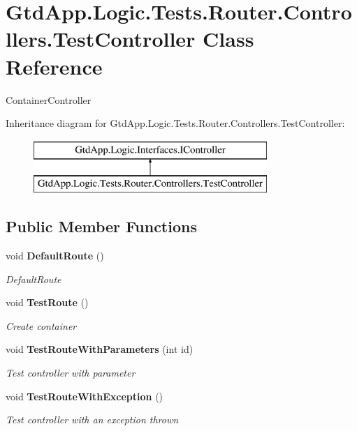 \section{Gtd\+App.\+Logic.\+Tests.\+Router.\+Controllers.\+Test\+Controller Class Reference}
\label{class_gtd_app_1_1_logic_1_1_tests_1_1_router_1_1_controllers_1_1_test_controller}


Container\+Controller  


Inheritance diagram for Gtd\+App.\+Logic.\+Tests.\+Router.\+Controllers.\+Test\+Controller\+:\begin{figure}[H]
\begin{center}
\leavevmode
\includegraphics[height=2.000000cm]{class_gtd_app_1_1_logic_1_1_tests_1_1_router_1_1_controllers_1_1_test_controller}
\end{center}
\end{figure}
\subsection*{Public Member Functions}
\begin{DoxyCompactItemize}
\item 
void \textbf{ Default\+Route} ()
\begin{DoxyCompactList}\small\item\em Default\+Route \end{DoxyCompactList}\item 
void \textbf{ Test\+Route} ()
\begin{DoxyCompactList}\small\item\em Create container \end{DoxyCompactList}\item 
void \textbf{ Test\+Route\+With\+Parameters} (int id)
\begin{DoxyCompactList}\small\item\em Test controller with parameter \end{DoxyCompactList}\item 
void \textbf{ Test\+Route\+With\+Exception} ()
\begin{DoxyCompactList}\small\item\em Test controller with an exception thrown \end{DoxyCompactList}\end{DoxyCompactItemize}



